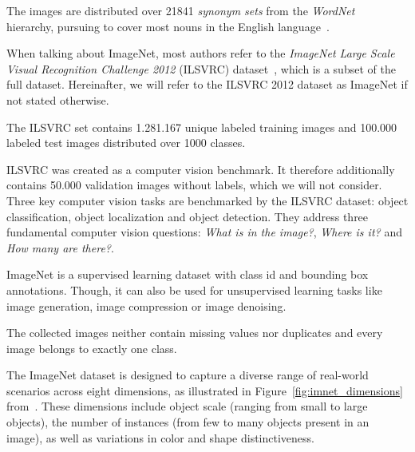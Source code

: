 The images are distributed over 21841 \textit{synonym sets} from the \textit{WordNet}~\cite{wordnet} hierarchy,
pursuing to cover most nouns in the English language~\cite{imagenet_breakdown}.

When talking about ImageNet, most authors refer to the
\textit{ImageNet Large Scale Visual Recognition Challenge 2012} (ILSVRC) dataset~\cite{ILSVRC15},
which is a subset of the full dataset.
Hereinafter, we will refer to the ILSVRC 2012 dataset as ImageNet if not stated otherwise.

The ILSVRC set contains 1.281.167 unique labeled training images and 100.000 labeled test images distributed over 1000
classes.

ILSVRC was created as a computer vision benchmark.
It therefore additionally contains 50.000 validation images without labels, which we will not consider.
Three key computer vision tasks are benchmarked by the ILSVRC dataset: object classification, object localization and
object detection.
They address three fundamental computer vision questions: \textit{What is in the image?}, \textit{Where is it?} and
\textit{How many are there?}.

ImageNet is a supervised learning dataset with class id and bounding box annotations.
Though, it can also be used for unsupervised learning tasks like image generation, image compression or image denoising.

The collected images neither contain missing values nor duplicates and every image belongs to exactly one class.

The ImageNet dataset is designed to capture a diverse range of real-world scenarios across eight dimensions, as
illustrated in Figure~\ref{fig:imnet_dimensions} from~\cite{imagenet_breakdown}.
These dimensions include object scale (ranging from small to large objects), the number of instances (from few to many
objects present in an image), as well as variations in color and shape distinctiveness.

